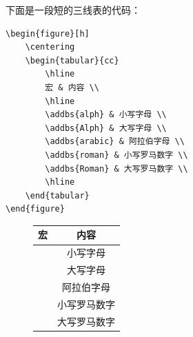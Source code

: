 下面是一段短的三线表的代码：
\begin{lstlisting}[style = LaTeX_TeXworks]
\begin{figure}[h]
	\centering
	\begin{tabular}{cc}
		\hline
		宏 & 内容 \\
		\hline
		\addbs{alph} & 小写字母 \\
		\addbs{Alph} & 大写字母 \\
		\addbs{arabic} & 阿拉伯字母 \\
		\addbs{roman} & 小写罗马数字 \\
		\addbs{Roman} & 大写罗马数字 \\
		\hline
	\end{tabular}
\end{figure}
\end{lstlisting}
\begin{figure}[h]
	\centering
	\begin{tabular}{cc}
		\hline
		宏 & 内容 \\
		\hline
		\addbs{alph} & 小写字母 \\
		\addbs{Alph} & 大写字母 \\
		\addbs{arabic} & 阿拉伯字母 \\
		\addbs{roman} & 小写罗马数字 \\
		\addbs{Roman} & 大写罗马数字 \\
		\hline
	\end{tabular}
\end{figure}
